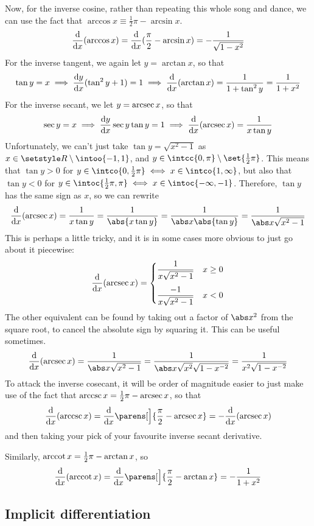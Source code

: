 Now, for the inverse cosine, rather than repeating this whole song and
dance, we can use the fact that
\(\arccos x \equiv \frac 12 \pi - \arcsin x\).
\begin{equation*}
 \dv{x}(\arccos x) = \dv{x}(\frac \pi 2 - \arcsin x)
     = -\frac 1{\sqrt{1 - x^2}}
\end{equation*}
For the inverse tangent, we again let \(y = \arctan x\), so that
\begin{equation*}
 \tan y = x \implies \dv<y>{x}(\tan^2 y + 1) = 1
     \implies \dv{x}(\arctan x) = \frac 1{1 + \tan^2 y}
         = \frac 1{1 + x^2}
\end{equation*}
For the inverse secant, we let \(y = \operatorname{arcsec} x\), so that
\begin{equation*}
 \sec y = x \implies \dv<y>{x} \sec y \tan y = 1
     \implies \dv{x}(\arcsec x) = \frac 1{x \tan y}
\end{equation*}
Unfortunately, we can't just take \(\tan y = \sqrt{x^2 - 1}\) as
\(x \in \Reals \setminus \intoo{-1, 1}\), and
\(y \in \intcc{0, \pi} \setminus \set{\frac 12 \pi}\). This means that
\(\tan y > 0\) for
\(y \in \intco{0, \frac 12 \pi} \iff x \in \intco{1, \infty}\), but also
that \(\tan y < 0\) for
\(y \in \intoc{\frac 12 \pi, \pi} \iff x \in \intoc{-\infty, -1}\).
Therefore, \(\tan y\) has the same sign as \(x\), so we can rewrite
\begin{equation*}
 \dv{x}(\arcsec x) = \frac 1{x \tan y} = \frac 1{\abs{x \tan y}}
     = \frac 1{\abs x\abs{\tan y}} = \frac 1{\abs x\sqrt{x^2 - 1}}
\end{equation*}
This is perhaps a little tricky, and it is in some cases more obvious to
just go about it piecewise:
\begin{equation*}
 \dv{x}(\arcsec x) =
 \begin{cases}
  \dfrac 1{x\sqrt{x^2 - 1}} & x \ge 0 \\[3ex]
  \dfrac {-1}{x\sqrt{x^2 - 1}} & x < 0
 \end{cases}
\end{equation*}
The other equivalent can be found by taking out a factor of \(\abs x^2\)
from the square root, to cancel the absolute sign by squaring it. This can
be useful sometimes.
\begin{equation*}
 \dv{x}(\arcsec x) = \frac 1{\abs x\sqrt{x^2 - 1}}
     = \frac 1{\abs x\sqrt{x^2}\sqrt{1 - x^{-2}}}
     = \frac 1{x^2\sqrt{1 - x^{-2}}}
\end{equation*}
To attack the inverse cosecant, it will be order of magnitude easier to just
make use of the fact that \(\operatorname{arccsc} x = \frac 12 \pi - \operatorname{arcsec} x\),
so that
\begin{equation*}
 \dv{x}(\arccsc x) = \dv{x}\parens[\Big]{\frac \pi 2 - \arcsec x}
                   = -\dv{x}(\arcsec x)
\end{equation*}
and then taking your pick of your favourite inverse secant derivative.

Similarly, \(\operatorname{arccot} x = \frac 12 \pi - \arctan x\), so
\begin{equation*}
 \dv{x}(\arccot x) = \dv{x}\parens[\Big]{\frac \pi 2 - \arctan x}
                   = -\frac 1{1 + x^2}
\end{equation*}

\subsection{Implicit differentiation}


